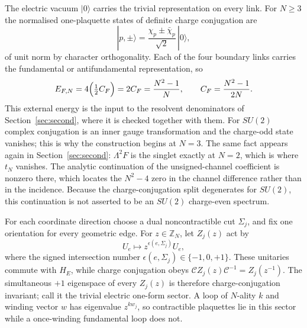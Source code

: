 \documentclass[11pt]{article}
\theoremstyle{plain}
\theoremstyle{definition}
\theoremstyle{remark}
\newcommand{\chk}[1]{}
\newcommand{\CF}{C_F}
\begin{document}
The electric vacuum $|0\rangle$ carries the trivial representation on every
link. For $N\ge3$ the normalised one-plaquette states of definite charge
conjugation are
\begin{equation}\label{eq:states}
  |p,\pm\rangle=\frac{\chi_p\pm\bar\chi_p}{\sqrt2}\,|0\rangle ,
\end{equation}
of unit norm by character orthogonality. Each of the four boundary links
carries the fundamental or antifundamental representation, so
\begin{equation}\label{eq:EF}
  E_{F,N}=4\Bigl(\tfrac12 \CF\Bigr)=2\CF=\frac{N^2-1}{N},
  \qquad \CF=\frac{N^2-1}{2N}.
\end{equation}
This external energy is the input to the resolvent denominators of
Section~\ref{sec:second}, where it is checked together with them.
For $SU(2)$ complex conjugation is an inner gauge transformation and the
charge-odd state vanishes; this is why the construction begins at $N=3$. The
same fact appears again in Section~\ref{sec:second}: $\Lambda^2F$ is the
singlet exactly at $N=2$, which is where $t_N$ vanishes. The analytic
continuation of the unsigned-channel coefficient is nonzero there, which
locates the $N^2-4$ zero in the channel difference rather than in the
incidence. Because the charge-conjugation split degenerates for $SU(2)$, this
continuation is not asserted to be an $SU(2)$ charge-even spectrum.
\chk{at N = 2 the C-odd hopping vanishes while the unsigned-channel continuation does not}

For each coordinate direction choose a dual noncontractible cut $\Sigma_j$,
and fix one orientation for every geometric edge. For $z\in\mathbb Z_N$, let
$Z_j(z)$ act by
\[
 U_e\longmapsto z^{\epsilon(e,\Sigma_j)}U_e,
\]
where the signed intersection number
$\epsilon(e,\Sigma_j)\in\{-1,0,+1\}$. These unitaries commute with $H_E$, while
charge conjugation obeys
$\mathcal C Z_j(z)\mathcal C^{-1}=Z_j(z^{-1})$. The simultaneous $+1$
eigenspace of every $Z_j(z)$ is therefore charge-conjugation invariant; call
it the trivial electric one-form sector. A loop of $N$-ality $k$ and winding
vector $w$ has eigenvalue $z^{kw_j}$, so contractible plaquettes lie in this
sector while a once-winding fundamental loop does not.
\end{document}
